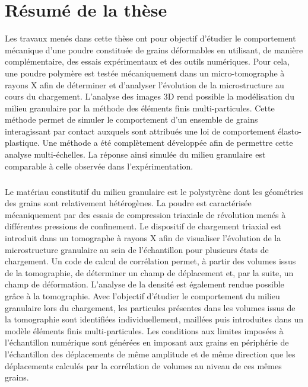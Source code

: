 \chapter*{Résumé de la thèse}

Les travaux menés dans cette thèse ont pour objectif d’étudier le comportement mécanique d’une poudre constituée de grains déformables en utilisant, de manière complémentaire, des essais expérimentaux et des outils numériques. Pour cela, une poudre polymère est testée mécaniquement dans un micro-tomographe à rayons X afin de déterminer et d’analyser l’évolution de la microstructure au cours du chargement. L’analyse des images 3D rend possible la modélisation du milieu granulaire par la méthode des éléments finis multi-particules. Cette méthode permet de simuler le comportement d’un ensemble de grains interagissant par contact auxquels sont attribués une loi de comportement élasto-plastique. Une méthode a été complètement développée afin de permettre cette analyse multi-échelles. La réponse ainsi simulée du milieu granulaire est comparable à celle observée dans l’expérimentation.
\paragraph{}
Le matériau constitutif du milieu granulaire est le polystyrène dont les géométries des grains sont relativement hétérogènes. La poudre est caractérisée mécaniquement par des essais de compression triaxiale de révolution menés à différentes pressions de confinement. Le dispositif de chargement triaxial est introduit dans un tomographe à rayons X afin de visualiser l’évolution de la microstructure granulaire au sein de l’échantillon pour plusieurs états de chargement. Un code de calcul de corrélation permet, à partir des volumes issus de la tomographie, de déterminer un champ de déplacement et, par la suite, un champ de déformation. L’analyse de la densité est également rendue possible grâce à la tomographie. Avec l’objectif d’étudier le comportement du milieu granulaire lors du chargement, les particules présentes dans les volumes issus de la tomographie sont identifiées individuellement, maillées puis introduites dans un modèle éléments finis multi-particules. Les conditions aux limites imposées à l’échantillon numérique sont générées en imposant aux grains en périphérie de l’échantillon des déplacements de même amplitude et de même direction que les déplacements calculés par la corrélation de volumes au niveau de ces mêmes grains.
